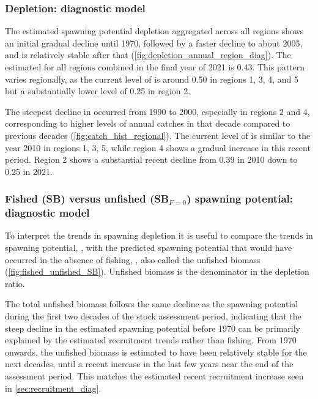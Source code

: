 \subsubsection{Depletion: diagnostic model}
\label{sec:depletion_diag}

The estimated spawning potential depletion \sbsbfo aggregated across all regions shows an initial gradual decline until 1970, followed by a faster decline to about 2005, and is relatively stable after that (\autoref{fig:depletion_annual_region_diag}). The estimated \sbsbfo for all regions combined in the final year of 2021 is 0.43. This pattern varies regionally, as the current level of \sbsbfo is around 0.50 in regions 1, 3, 4, and 5 but a substantially lower level of 0.25 in region 2.

The steepest decline in \sbsbfo occurred from 1990 to 2000, especially in regions 2 and 4, corresponding to higher levels of annual catches in that decade compared to previous decades (\autoref{fig:catch_hist_regional}). The current level of \sbsbfo is similar to the year 2010 in regions 1, 3, 5, while region 4 shows a gradual increase in this recent period. Region 2 shows a substantial recent decline from 0.39 in 2010 down to 0.25 in 2021.

\subsubsection{Fished (SB) versus unfished (SB$_{F=0}$) spawning potential: diagnostic model}
\label{sec:fished_unfished_diag}

To interpret the trends in spawning depletion it is useful to compare the trends in spawning potential, \sb, with the predicted spawning potential that would have occurred in the absence of fishing, \sbfo, also called the unfished biomass (\autoref{fig:fished_unfished_SB}). Unfished biomass is the denominator in the depletion ratio.

The total unfished biomass follows the same decline as the spawning potential during the first two decades of the stock assessment period, indicating that the steep decline in the estimated spawning potential before 1970 can be primarily explained by the estimated recruitment trends rather than fishing. From 1970 onwards, the unfished biomass is estimated to have been relatively stable for the next decades, until a recent increase in the last few years near the end of the assessment period. This matches the estimated recent recruitment increase seen in \autoref{sec:recruitment_diag}.

